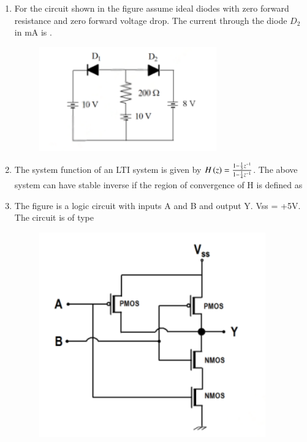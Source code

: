 \documentclass[journal,12pt,onecolumn]{IEEEtran}
\theoremstyle{remark}
\begin{document}
\begin{enumerate}
    \item For the circuit shown in the figure assume ideal diodes with zero forward resistance and zero forward voltage drop. The current through the diode $D_2$ in mA is \underline{\hspace{2cm}}.
    \begin{figure}[H]
        \centering
        \includegraphics[width=0.4\columnwidth]{q15}
        \caption*{}
        \label{fig:q15}
    \end{figure}
    \hfill{}
    
    \item The system function of an LTI system is given by $H\left(z\right) = \frac{1 - \frac{1}{3}z^{-1}}{1 - \frac{1}{4}z^{-1}}$. The above system can have stable inverse if the region of convergence of H is defined as

    \hfill{}
        \begin{enumerate}
        \end{enumerate}
    
    \item The figure is a logic circuit with inputs A and B and output Y. Vss = +5V. The circuit is of type
    \begin{figure}[H]
        \centering
        \includegraphics[width=0.4\columnwidth]{q17}
        \caption*{}
        \label{fig:q17}
    \end{figure}


\end{enumerate}
\end{document}

